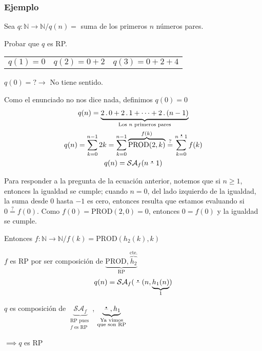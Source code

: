 \subsubsection{Ejemplo}
Sea $q: \mathbb{N} \to \mathbb{N} / q(n) =$ suma de los primeros $n$ números 
pares.

Probar que $q$ es RP.

\medskip

\begin{center}
    \begin{tabular}{c c c}
        $q(1)=0$ & $q(2)=0 + 2$ & $q(3)=0 + 2 + 4$ \\
    \end{tabular}

    $q(0) = ? \rightarrow$ No tiene sentido.
\end{center}
Como el enunciado no nos dice nada, definimos $q(0)=0$
\begin{gather*}
    q(n) = \underbrace{2 \, . \, 0 + 2 \, . \, 1 + \dots + 2 \, . \, (n-1)}_{%
    \text{Los } n \text{ primeros pares}} \\
    q(n) = \sum_{k=0}^{n-1} 2 k 
    = \sum_{k=0}^{n-1} \overbrace{\mathrm{PROD}(2,k)}^{f(k)} 
    \stackrel{?}{=} \sum_{k=0}^{n \restatruncada 1} f(k) \\
    q(n) = \mathcal{SA}_f (n \restatruncada 1)
\end{gather*}

Para responder a la pregunta de la ecuación anterior, notemos que si 
$n \geq 1$, entonces la igualdad se cumple; cuando $n = 0$, del lado
izquierdo de la igualdad, la suma desde 0 hasta $-1$ es cero, entonces
resulta que estamos evaluando si $0 \stackrel{?}{=} f(0)$.
Como  $f(0) = \mathrm{PROD}(2,0) = 0$, entonces $0 = f(0)$ y la igualdad
se cumple.

Entonces $f: \mathbb{N} \to \mathbb{N} / f(k) = \mathrm{PROD}(h_2(k), k)$

$f$ es RP por ser composición de 
$\underbrace{\mathrm{PROD}, \overbrace{h_2}^{\text{cte.}}}_{\text{RP}}$
\begin{gather*}
    q(n) = \mathcal{SA}_f (\;\accentset{\mbox{\large\bfseries .}}{\text{--}}\; (n, \underbrace{h_1(n)}_{1})
\end{gather*}

$q$ es composición de $\underbrace{\mathcal{SA}_f}_{\substack{%
\text{RP pues }\\ f \text{ es RP}}}$,
$\underbrace{\restatruncada, h_1}_{\substack{\text{Ya vimos}\\%
\text{que son RP}}}$
\begin{center}
    $\implies q$ es RP
\end{center}


